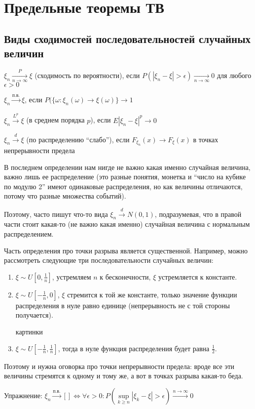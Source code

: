 \chapter{Предельные теоремы ТВ}
\section{Виды сходимостей последовательностей случайных величин}
\begin{Def}
$\xi_n \xrightarrow[n \to \infty]{P} \xi$ (сходимость по вероятности), если $P(|\xi_n - \xi| > \epsilon) \xrightarrow[n \to \infty]{} 0$ для любого $\epsilon > 0$

$\xi_n \xrightarrow[]{\text{п.в.}} \xi$, если $P(\{\omega\colon \xi_n(\omega) \to \xi(\omega)\} \to 1$

$\xi_n \xrightarrow{L^p} \xi$ (в среднем порядка $p$), если $E|\xi_n - \xi|^p \to 0$

$\xi_n \xrightarrow{d} \xi$ (по распределению ``слабо''), если $F_{\xi_n}(x) \to F_\xi(x)$ в точках непрерывности предела
\end{Def}
\begin{Rem}
    В последнем определении нам нигде не важно какая именно случайная величина, важно лишь ее распределение 
    (это разные понятия, монетка и ``число на кубике по модулю 2'' имеют одинаковые распределения, но как величины отличаются, потому что разные множества событий).

    Поэтому, часто пишут что-то вида $\xi_n \xrightarrow{d} N(0, 1)$, подразумевая, что в правой части стоит какая-то (не важно какая именно) случайная величина с нормальным распределением.
\end{Rem}
\begin{Rem}
Часть определения про точки разрыва является существенной.
Например, можно рассмотреть следующие три последовательности случайных величин:

\begin{enumerate}

\item $\xi \sim U[0, \frac1n]$, устремляем $n$ к бесконечности, $\xi$ устремляется к константе.

\item $\xi \sim U[-\frac1n, 0]$, $\xi$ стремится к той же константе, только значение функции распределения в нуле равно единице (непрерывность не с той стороны получается).

\TODO картинки

\item $\xi \sim U[-\frac1n, \frac1n]$, тогда в нуле функция распределения будет равна $\frac12$. 
\end{enumerate}
Поэтому и нужна оговорка про точки непрерывности предела: вроде все эти величины стремятся к одному и тому же, а вот в точках разрыва какая-то беда.

\end{Rem}
Упражнение: $\xi_n \xrightarrow[]{\text{п.в.}}[] \Leftrightarrow \forall \epsilon > 0 \colon P(\sup\limits_{k\geq n} |\xi_k - \xi| > \epsilon) \xrightarrow[]{n \to \infty} 0$

